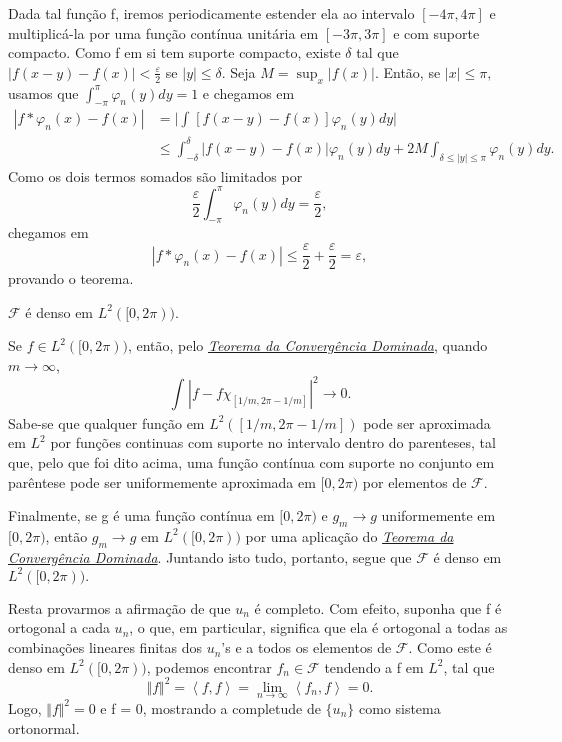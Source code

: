 \documentclass[measure_theory.tex]{subfiles}
\begin{document}
\begin{proof*}
	Dada tal função f, iremos periodicamente estender ela ao intervalo \([-4\pi , 4\pi ]\) e multiplicá-la por uma função contínua unitária em \([-3\pi , 3\pi ]\) e com suporte compacto. Como f em si tem suporte compacto, existe \(\delta \) tal que \(|f(x-y) - f(x)| < \frac{\varepsilon }{2}\)
	se \(|y|\leq \delta \). Seja \(M = \sup_{x}|f(x)|.\) Então, se \(|x| \leq \pi ,\) usamos que \(\int_{-\pi }^{\pi }\varphi_{n}(y)dy = 1\) e chegamos em
	\begin{align*}
		|f*\varphi_{n}(x) - f(x)| & =\biggl\vert \int_{}^{}[f(x-y)-f(x)]\varphi_{n}(y)dy \biggr\vert                                                      \\
		                          & \leq \int_{-\delta }^{\delta }|f(x-y) - f(x)|\varphi_{n}(y)dy + 2M \int_{\delta\leq |y|\leq \pi }^{}\varphi_{n}(y)dy.
	\end{align*}
	Como os dois termos somados são limitados por
	\[
		\frac{\varepsilon }{2}\int_{-\pi }^{\pi }\varphi_{n}(y)dy = \frac{\varepsilon }{2},
	\]
	chegamos em
	\[
		|f*\varphi_{n}(x) - f(x)| \leq \frac{\varepsilon }{2} + \frac{\varepsilon }{2} = \varepsilon,
	\]
	provando o teorema. \qedsymbol
\end{proof*}
\begin{theorem*}
	\(\mathcal{F}\) é denso em \(L^{2}([0, 2\pi )).\)
\end{theorem*}
\begin{proof*}
	Se \(f\in L^{2}([0, 2\pi ))\), então, pelo \hyperlink{dominated_convergence}{\textit{Teorema da Convergência Dominada}}, quando \(m\to \infty\),
	\[
		\int_{}^{}|f-f\chi_{[1/m, 2\pi -1/m]}|^{2}\to 0.
	\]
	Sabe-se que qualquer função em \(L^{2}([1/m, 2\pi - 1/m])\) pode ser aproximada em \(L^{2}\) por funções continuas com suporte no intervalo dentro do parenteses, tal que, pelo que foi
	dito acima, uma função contínua com suporte no conjunto em parêntese pode ser uniformemente aproximada em \([0, 2\pi )\) por elementos de \(\mathcal{F}\).

	Finalmente, se g é uma função contínua em \([0, 2\pi )\) e \(g_{m}\to g\) uniformemente em \([0, 2\pi )\), então \(g_{m}\to g\) em \(L^{2}([0, 2\pi ))\) por uma aplicação do \hyperlink{dominated_convergence}{\textit{Teorema da Convergência Dominada}}.
	Juntando isto tudo, portanto, segue que \(\mathcal{F}\) é denso em \(L^{2}([0, 2\pi )).\) \qedsymbol
\end{proof*}
Resta provarmos a afirmação de que \(u_{n}\) é completo. Com efeito, suponha que f é ortogonal a cada \(u_{n}\), o que, em particular, significa que ela é ortogonal a todas as combinações lineares finitas dos \(u_{n}\)'s e a todos os elementos de \(\mathcal{F}.\) Como este é denso em \(L^{2}([0, 2\pi ))\),
podemos encontrar \(f_{n}\in \mathcal{F}\) tendendo a f em \(L^{2}\), tal que
\[
	\Vert f \Vert^{2} = \left< f, f \right> = \lim_{n\to \infty}\left< f_{n}, f \right> = 0.
\]
Logo, \(\Vert f \Vert^{2} = 0 \) e f = 0, mostrando a completude de \(\{u_{n}\}\) como sistema ortonormal.
\end{document}
